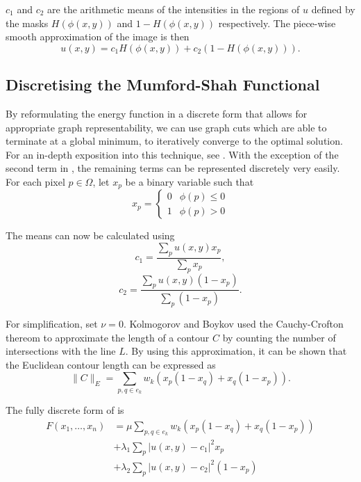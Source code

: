 \documentclass[10pt, journal, letterpaper, onecolumn, draftcls]{IEEEtran}
\begin{document}
$c_1$ and $c_2$ are the arithmetic means of the intensities in the regions of $u$ defined by the masks $H(\phi(x,y))$ and $1-H(\phi(x,y))$ respectively. The piece-wise smooth approximation of the image is then 
\begin{equation}
	u(x,y) = c_1 H(\phi(x,y)) + c_2(1-H(\phi(x,y))).
	\label{eq:piecewiseapproximation}
\end{equation}

\subsection{Discretising the Mumford-Shah Functional}
By reformulating the energy function in a discrete form that allows for appropriate graph representability, we can use graph cuts which are able to terminate at a global minimum, to iteratively converge to the optimal solution. For an in-depth exposition into this technique, see \cite{Mumford1989,Chan2001,ElZehiry2007}.
With the exception of the second term in , the remaining terms can be represented discretely very easily. For each pixel $p \in \Omega$, let $x_p$ be a binary variable such that
\begin{equation}
	x_p = 
	\begin{cases} 
	0 & \phi(p)\leq 0 \\
	1 & \phi(p)> 0
	\end{cases}
\end{equation}

The means can now be calculated using 
\begin{equation}
	c_1 = \frac{\sum_p u(x,y)x_p}{\sum_p x_p},
\end{equation}
\begin{equation}
	c_2 = \frac{\sum_p u(x,y)(1-x_p)}{\sum_p (1-x_p)}.
\end{equation}

For simplification, set $\nu = 0$. Kolmogorov and Boykov \cite{Kolmogorov2005_2,Boykov2003} used the Cauchy-Crofton thereom to approximate the length of a contour $C$ by counting the number of intersections with the line $L$. By using this approximation, it can be shown that the Euclidean contour length can be expressed as
\begin{equation}
	\lVert C \rVert_E = \sum_{p,q \in e_k} w_k( x_p(1-x_q) + x_q(1-x_p)).
\end{equation}

The fully discrete form of  is
\begin{equation}
	\begin{split}
	F(x_1, \ldots, x_n) & = \mu \sum_{p,q \in e_k} w_k( x_p(1-x_q) + x_q(1-x_p)) \\
	& + \lambda_1 \sum_p |u(x,y)-c_1|^2x_p \\
	& + \lambda_2 \sum_p |u(x,y)-c_2|^2(1-x_p)
	\end{split}
	\label{eq:discretemumfordshah}
\end{equation}
\end{document}
